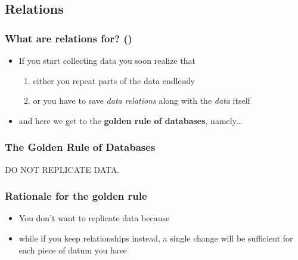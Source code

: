 \documentclass[\printmode,compress,xcolor=dvipsnames]{beamer}
\begin{document}
\subsection{Relations}

\setcounter{ms}{0}
\begin{frame}
  \frametitle<+->{What are relations for? ()}

  \begin{itemize}[<+- | alert@+->]

    \item If you start collecting data you soon realize that

      \begin{enumerate}[<+- | alert@+->][a) ]

          \item either you repeat parts of the data endlessly

          \item or you have to save \emph{data relations} along with the \emph{data} itself

      \end{enumerate}

    \item and here we get to the {\bfseries golden rule of databases}, namely\dots

  \end{itemize}

\end{frame}

\begin{frame}
  \frametitle<+->{The Golden Rule of Databases}

  \begin{center}
    \begin{Huge}
      \begin{bfseries}
        \alert{DO NOT REPLICATE DATA.}
      \end{bfseries}
    \end{Huge}
  \end{center}

\end{frame}

\begin{frame}
  \frametitle<+->{Rationale for the golden rule}

  \begin{itemize}[<+- | alert@+->]

    \item You don't want to replicate data because

    \item while if you keep relationships instead, a single change will be
            sufficient for each piece of datum you have

  \end{itemize}

\end{frame}
\end{document}
